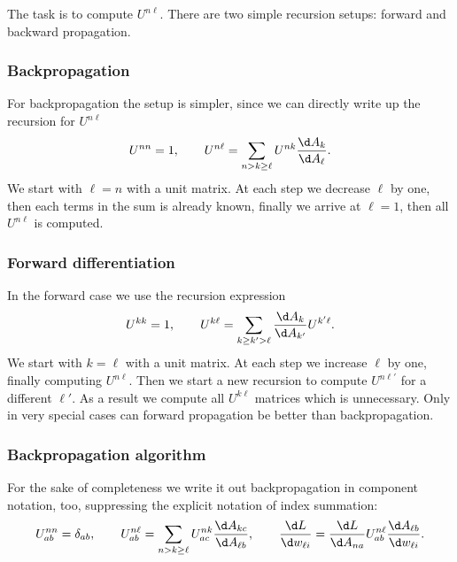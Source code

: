 \documentclass{article}
\begin{document}
The task is to compute $U^{n\ell}$. There are two simple recursion
setups: forward and backward propagation. 

\subsubsection{Backpropagation}

For backpropagation the setup is simpler, since we can directly write
up the recursion for $U^{n\ell}$
\begin{equation}
  U^{nn} = 1,\qquad U^{n\ell} = \sum\limits_{n> k \ge \ell} U^{nk}
  \frac{\d A_{k}}{\d A_{\ell}}. 
\end{equation}
We start with $\ell=n$ with a unit matrix. At each step we decrease
$\ell$ by one, then each terms in the sum is already known, finally we
arrive at $\ell=1$, then all $U^{n\ell}$ is computed.

\subsubsection{Forward differentiation}

In the forward case we use the recursion expression
\begin{equation}
  U^{kk} = 1,\qquad U^{k\ell} = \sum\limits_{k\ge k'>\ell} \frac{\d A_k}{\d
    A_{k'}}U^{k'\ell}.
\end{equation}
We start with $k=\ell$ with a unit matrix. At each step we increase
$\ell$ by one, finally computing $U^{n\ell}$. Then we start a new
recursion to compute $U^{n\ell'}$ for a different $\ell'$. As a result
we compute all $U^{k\ell}$ matrices which is unnecessary. Only in very
special cases can forward propagation be better than backpropagation.

\subsubsection{Backpropagation algorithm}

For the sake of completeness we write it out backpropagation in
component notation, too, suppressing the explicit notation of index
summation:
\begin{equation}
  U^{nn}_{ab} = \delta_{ab} ,\qquad U^{n\ell}_{ab} = \sum\limits_{n> k
    \ge \ell} U^{nk}_{ac} \frac{\d A_{kc}}{\d A_{\ell
      b}}, \qquad \frac{\d L}{\d w_{\ell i}} = \frac{\d L}{\d A_{na}}
  U^{n\ell}_{ab} \frac{\d A_{\ell b}}{\d w_{\ell i}}.
\end{equation}
\end{document}
